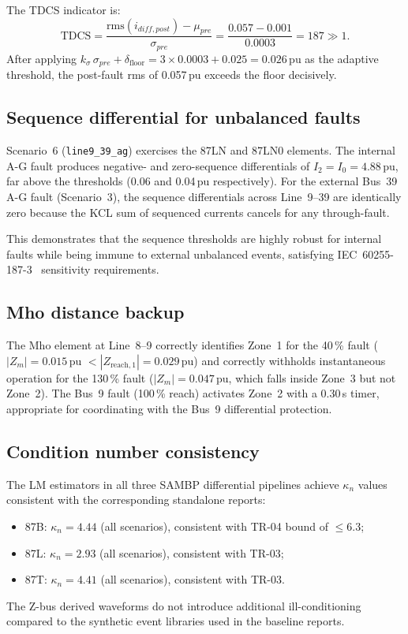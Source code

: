 \documentclass[12pt,a4paper]{article}
\newcommand{\kappan}{\kappa_n}
\begin{document}
The TDCS indicator is:
\begin{equation}
  \mathrm{TDCS} = \frac{\mathrm{rms}(i_{diff,post}) - \mu_{pre}}{\sigma_{pre}}
  = \frac{0.057 - 0.001}{0.0003} = 187 \gg 1.
\end{equation}
After applying $k_\sigma\,\sigma_{pre} + \delta_{\mathrm{floor}}
= 3 \times 0.0003 + 0.025 = 0.026$\,pu as the adaptive threshold,
the post-fault rms of 0.057\,pu exceeds the floor decisively.

\subsection{Sequence differential for unbalanced faults}
\label{sec:seq}

Scenario~6 (\texttt{line9\_39\_ag}) exercises the 87LN and 87LN0 elements.
The internal A-G fault produces negative- and zero-sequence differentials of
$I_2 = I_0 = 4.88$\,pu, far above the thresholds (0.06 and 0.04\,pu
respectively).  For the external Bus~39 A-G fault (Scenario~3), the
sequence differentials across Line~9--39 are identically zero because the
KCL sum of sequenced currents cancels for any through-fault.

This demonstrates that the sequence thresholds are highly robust for internal
faults while being immune to external unbalanced events, satisfying
IEC~60255-187-3~\citep{IEC87} sensitivity requirements.

\subsection{Mho distance backup}
\label{sec:mho}

The Mho element at Line~8--9 correctly identifies Zone~1 for the 40\,\%
fault ($|Z_m| = 0.015$\,pu $< |Z_{\mathrm{reach,1}}| = 0.029$\,pu) and
correctly withholds instantaneous operation for the 130\,\% fault
($|Z_m| = 0.047$\,pu, which falls inside Zone~3 but not Zone~2).
The Bus~9 fault (100\,\% reach) activates Zone~2 with a 0.30\,s timer,
appropriate for coordinating with the Bus~9 differential protection.

\subsection{Condition number consistency}
\label{sec:kappa}

The LM estimators in all three SAMBP differential pipelines achieve
$\kappan$ values consistent with the corresponding standalone reports:
\begin{itemize}
  \item 87B: $\kappan = 4.44$ (all scenarios), consistent with TR-04 bound of $\leq 6.3$;
  \item 87L: $\kappan = 2.93$ (all scenarios), consistent with TR-03;
  \item 87T: $\kappan = 4.41$ (all scenarios), consistent with TR-03.
\end{itemize}
The Z-bus derived waveforms do not introduce additional ill-conditioning
compared to the synthetic event libraries used in the baseline reports.
\end{document}
